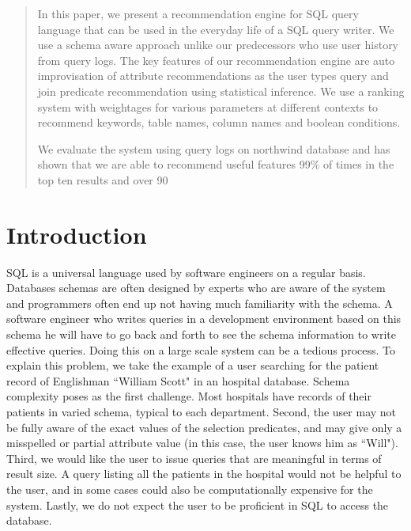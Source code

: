 \documentclass{acm_proc_article-sp}
\begin{document}
\maketitle
\begin{abstract}
In this paper, we present a recommendation engine for SQL query language that can be used in the everyday life of a SQL query writer. We use a schema aware approach unlike our predecessors who use user history from query logs.  The key features of our recommendation engine are auto improvisation of attribute recommendations as the user types query and join predicate recommendation using statistical inference. We use a ranking system with weightages for various parameters at different contexts to recommend keywords, table names, column names and boolean conditions.

We evaluate the system using query logs on northwind database and has shown that we are able to recommend useful features 99\% of times in the top ten results and over 90%
\end{abstract}



\section{Introduction}
SQL is a universal language used by software engineers on a regular basis. Databases schemas are often designed by experts who are aware of the system and programmers often end up not having much familiarity with the schema. A software engineer who writes queries in a development environment based on this schema he will have to go back and forth to see the schema information to write effective queries. Doing this on a large scale system can be a tedious process. To explain this problem, we take the example of a user searching for the patient record of Englishman ``William Scott" in an hospital database. Schema complexity poses as the first challenge. Most hospitals have records of their patients in varied schema, typical to each department. Second, the user may not be fully aware of the exact values of the selection predicates, and may give only a misspelled or partial attribute value (in this case, the user knows him as ``Will"). Third, we would like the user to issue queries that are meaningful in terms of result size. A query listing all the patients in the hospital would not be helpful to the user, and in some cases could also be computationally expensive for the system. Lastly, we do not expect the user to be proficient in SQL to access the database. 
\end{document}
